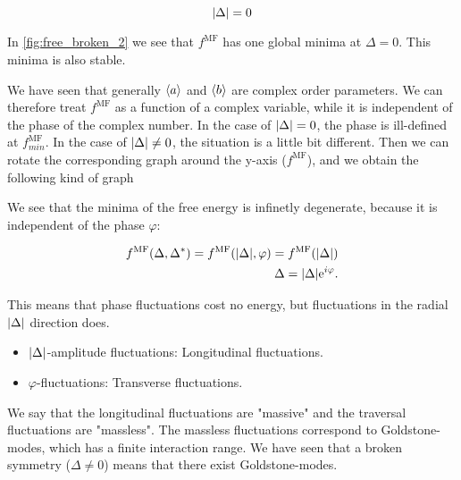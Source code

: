 \begin{equation*}
     \abs{\Delta} = 0
\end{equation*}

In \cref{fig:free_broken_2} we see that $f^{\text{MF}}$ has one global minima at $\Delta = 0$. This minima is also stable. 

We have seen that generally $\expval{a}$ and $\expval{b}$ are complex order parameters. We can therefore treat $f^{\text{MF}}$ as a function of a complex variable, while it is independent of the phase of the complex number. In the case of $\abs{\Delta} = 0$, the phase is ill-defined at $f^{\text{MF}}_{min}$. In the case of $\abs{\Delta} \neq 0$, the situation is a little bit different. Then we can rotate the corresponding graph around the y-axis ($f^{\text{MF}}$), and we obtain the following kind of graph

%     


We see that the minima of the free energy is infinetly degenerate, because it is independent of the phase $\varphi$: 

\begin{align*}
    f^{\text{MF}}(\Delta, \Delta^*) = f^{\text{MF}}(\abs{\Delta}, \varphi) = f^{\text{MF}}(\abs{\Delta}) \\
    \Delta = \abs{\Delta}\mathrm{e}^{i\varphi}. 
\end{align*}

This means that phase fluctuations cost no energy, but fluctuations in the radial $\abs{\Delta}$ direction does.
\begin{itemize}
	\item $\abs{\Delta}$-amplitude fluctuations: Longitudinal fluctuations.
	\item $\varphi$-fluctuations: Transverse fluctuations. 
\end{itemize}

We say that the longitudinal fluctuations are "massive" and the traversal fluctuations are "massless". The massless fluctuations correspond to Goldstone-modes, which has a finite interaction range. We have seen that a broken symmetry ($\Delta \neq 0$) means that there exist Goldstone-modes. 

